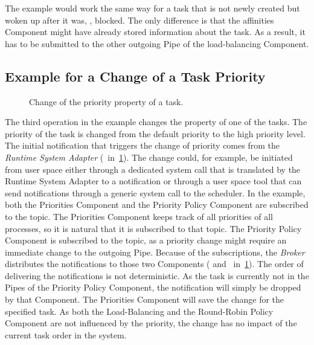 The example would work the same way for a task that is not newly created but woken up after it was, \eg{}, blocked. The only difference is that the affinities Component might have already stored information about the task. As a result, it has to be submitted to the other outgoing Pipe of the load-balancing Component.

\subsection{Example for a Change of a Task Priority}%
\label{sec:arch:example:step3}

\begin{figure}[b!] \centering
	\caption{Change of the priority property of a task.}%
	\label{fig:arch:example:step3}
\end{figure}

The third operation in the example changes the property of one of the tasks. The priority of the  task is changed from the default priority to the high priority level. The initial notification that triggers the change of priority comes from the \emph{Runtime System Adapter} (~in~\cref{fig:arch:example:step3}). The change could, for example, be initiated from user space either through a dedicated system call that is translated by the Runtime System Adapter to a notification or through a user space tool that can send notifications through a generic system call to the scheduler. In the example, both the Priorities Component and the Priority Policy Component are subscribed to the  topic. The Priorities Component keeps track of all priorities of all processes, so it is natural that it is subscribed to that topic. The Priority Policy Component is subscribed to the topic, as a priority change might require an immediate change to the outgoing Pipe. Because of the subscriptions, the \emph{Broker} distributes the notifications to those two Components ( and ~in~\cref{fig:arch:example:step3}). The order of delivering the notifications is not deterministic. As the  task is currently not in the Pipes of the Priority Policy Component, the notification will simply be dropped by that Component. The Priorities Component will save the change for the specified task. As both the Load-Balancing and the Round-Robin Policy Component are not influenced by the priority, the change has no impact of the current task order in the system.

